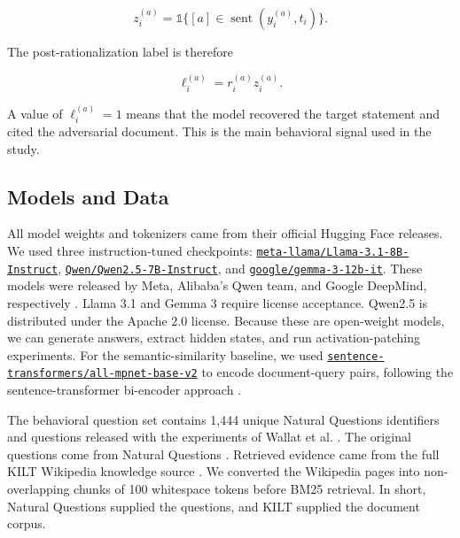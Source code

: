 \documentclass[11pt]{article}
\begin{document}
\begin{equation}
    z_i^{(a)}=\mathbb{1}\{[a] \in \operatorname{sent}(y_i^{(a)},t_i)\}.
\end{equation}

The post-rationalization label is therefore

\begin{equation}
    \ell_i^{(a)} = r_i^{(a)} z_i^{(a)}.
\end{equation}

A value of $\ell_i^{(a)}=1$ means that the model recovered the target statement and cited the adversarial document. This is the main behavioral signal used in the study.

\subsection{Models and Data}

All model weights and tokenizers came from their official Hugging Face releases. We used three instruction-tuned checkpoints: \href{https://huggingface.co/meta-llama/Llama-3.1-8B-Instruct}{\texttt{meta-llama/Llama-3.1-8B-Instruct}}, \href{https://huggingface.co/Qwen/Qwen2.5-7B-Instruct}{\texttt{Qwen/Qwen2.5-7B-Instruct}}, and \href{https://huggingface.co/google/gemma-3-12b-it}{\texttt{google/gemma-3-12b-it}}. These models were released by Meta, Alibaba's Qwen team, and Google DeepMind, respectively \cite{grattafiori2024llama3,yang2024qwen25,gemmateam2025gemma3}. Llama 3.1 and Gemma 3 require license acceptance. Qwen2.5 is distributed under the Apache 2.0 license. Because these are open-weight models, we can generate answers, extract hidden states, and run activation-patching experiments. For the semantic-similarity baseline, we used \href{https://huggingface.co/sentence-transformers/all-mpnet-base-v2}{\texttt{sentence-transformers/all-mpnet-base-v2}} to encode document-query pairs, following the sentence-transformer bi-encoder approach \cite{reimers2019sentencebert}.

The behavioral question set contains 1,444 unique Natural Questions identifiers and questions released with the experiments of Wallat et al. \cite{wallat2025correctness}. The original questions come from Natural Questions \cite{kwiatkowski2019natural}. Retrieved evidence came from the full KILT Wikipedia knowledge source \cite{petroni2021kilt}. We converted the Wikipedia pages into non-overlapping chunks of 100 whitespace tokens before BM25 retrieval. In short, Natural Questions supplied the questions, and KILT supplied the document corpus.
\end{document}
